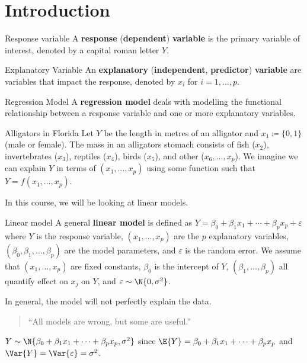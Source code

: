 \chapter*{Introduction}
\begin{Definition}{Response variable}{}
    A \textbf{response} (\textbf{dependent})
    \textbf{variable} is the primary variable
    of interest, denoted by a capital
    roman letter $ Y $.
\end{Definition}
\begin{Definition}{Explanatory Variable}{}
    An \textbf{explanatory} (\textbf{independent}, \textbf{predictor})
    \textbf{variable} are variables that
    impact the response, denoted by $ x_i $
    for $ i=1,\ldots,p $.
\end{Definition}
\begin{Definition}{Regression Model}{}
    A \textbf{regression model}
    deals with modelling the functional relationship between a response
    variable and one or more explanatory variables.
\end{Definition}
\begin{Example}{Alligators in Florida}{}
    Let $ Y $ be the length in metres of an alligator
    and $ x_1\coloneq \{0,1\} $ (male or female).
    The mass in an alligators stomach consists of
    fish ($ x_2 $), invertebrates ($ x_3 $),
    reptiles ($ x_4 $), birds ($ x_5 $),
    and other ($ x_6,\ldots,x_p $).
    We imagine we can explain $ Y $ in terms
    of $ (x_1,\ldots,x_p) $ using some function
    such that $ Y=f(x_1,\ldots,x_p) $.
\end{Example}
In this course, we will be looking at linear models.
\begin{Definition}{Linear model}{}
    A general \textbf{linear model} is defined as
    $ Y=\beta_0+\beta_1x_1+\cdots+\beta_p x_p+\varepsilon $
    where $ Y $ is the response variable, $ (x_1,\ldots,x_p) $
    are the $ p $ explanatory variables,
    $ (\beta_0,\beta_1,\ldots,\beta_p) $
    are the model parameters, and $ \varepsilon $
    is the random error. We assume
    that $ (x_1,\ldots,x_p) $ are fixed constants,
    $ \beta_0 $ is the intercept of $ Y $,
    $ (\beta_1,\ldots,\beta_p) $ all quantify effect on $ x_j $
    on $ Y $, and $ \varepsilon \sim \N{0,\sigma^2} $.
\end{Definition}
\begin{Remark}{}{}
    In general, the model will not perfectly explain the data.
    \begin{quote}
        ``All models are wrong, but some are useful.''
    \end{quote}
\end{Remark}
$ Y \sim \N{\beta_0+\beta_1x_1+\cdots+\beta_p x_p,\sigma^2} $
since $ \E{Y}=\beta_0+\beta_1x_1+\cdots+\beta_p x_p $ and
$ \Var{Y}=\Var{\varepsilon}=\sigma^2 $.
